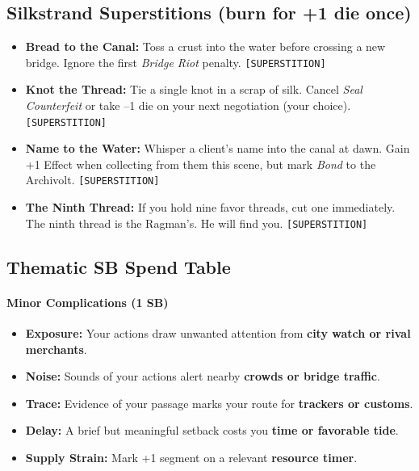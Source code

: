 \subsection*{Silkstrand Superstitions (burn for +1 die once)}
\begin{itemize}
  \item \textbf{Bread to the Canal:} Toss a crust into the water before crossing a new bridge. Ignore the first \emph{Bridge Riot} penalty. \texttt{[SUPERSTITION]}
  \item \textbf{Knot the Thread:} Tie a single knot in a scrap of silk. Cancel \emph{Seal Counterfeit} or take --1 die on your next negotiation (your choice). \texttt{[SUPERSTITION]}
  \item \textbf{Name to the Water:} Whisper a client's name into the canal at dawn. Gain +1 Effect when collecting from them this scene, but mark \emph{Bond} to the Archivolt. \texttt{[SUPERSTITION]}
  \item \textbf{The Ninth Thread:} If you hold nine favor threads, cut one immediately. The ninth thread is the Ragman's. He will find you. \texttt{[SUPERSTITION]}
\end{itemize}

\subsection*{Thematic SB Spend Table}
\label{sec:silkstrand-sb}

\paragraph{Minor Complications (1 SB)}
\begin{itemize}
\item \textbf{Exposure:} Your actions draw unwanted attention from \textbf{city watch or rival merchants}.
\item \textbf{Noise:} Sounds of your actions alert nearby \textbf{crowds or bridge traffic}.
\item \textbf{Trace:} Evidence of your passage marks your route for \textbf{trackers or customs}.
\item \textbf{Delay:} A brief but meaningful setback costs you \textbf{time or favorable tide}.
\item \textbf{Supply Strain:} Mark +1 segment on a relevant \textbf{resource timer}.
\end{itemize}

